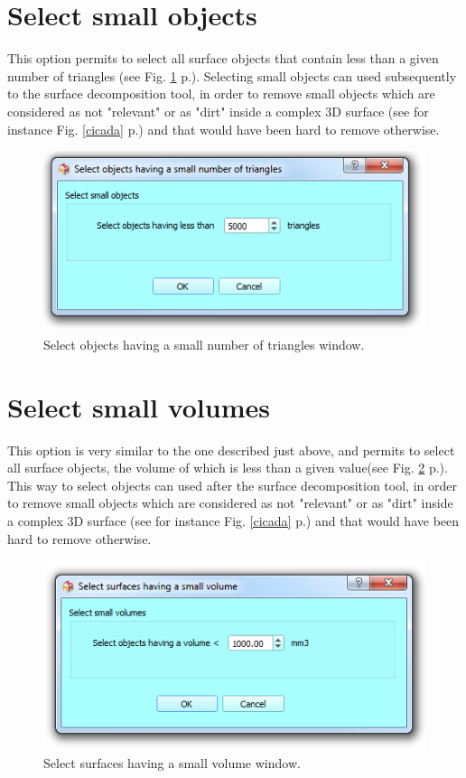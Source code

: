 \section{Select small objects}

This option permits to select all surface objects that contain less than a given number of triangles (see Fig. \ref{delete_small_objects} p.\pageref{delete_small_objects}). Selecting small objects can used subsequently to the surface decomposition tool, in order to remove small objects which are considered as not "relevant" or as "dirt" inside a complex 3D surface (see for instance Fig. \ref{cicada} p.\pageref{cicada}) and that would have been hard to remove otherwise.

\begin{figure}
  \centering
  \includegraphics[scale=0.35]{images/09/remove_small_objects/triangles.png} 
	\caption{Select objects having a small number of triangles window.
	}
 \label{delete_small_objects}
\end{figure}

\section{Select small volumes}
This option is very similar to the one described just above, and permits to select all surface objects, the volume of which is less than a given value(see Fig. \ref{delete_small_volumes} p.\pageref{delete_small_volumes}). This way to select objects can used after the surface decomposition tool, in order to remove small objects which are considered as not "relevant" or as "dirt" inside a complex 3D surface (see for instance Fig. \ref{cicada} p.\pageref{cicada}) and that would have been hard to remove otherwise.


\begin{figure}
  \centering
  \includegraphics[scale=0.35]{images/09/remove_small_objects/volume.png} 
	\caption{Select surfaces having a small volume window.
	}
 \label{delete_small_volumes}
\end{figure}

